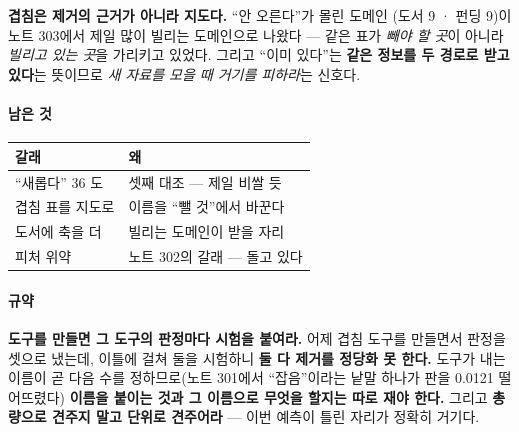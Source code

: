 \documentclass[10pt]{article}
\begin{document}
\textbf{겹침은 제거의 근거가 아니라 지도다.} ``안 오른다''가 몰린 도메인
(도서 9 · 펀딩 9)이 노트 303에서 제일 많이 빌리는 도메인으로 나왔다 ---
같은 표가 \emph{빼야 할 곳}이 아니라 \emph{빌리고 있는 곳}을 가리키고
있었다. 그리고 ``이미 있다''는 \textbf{같은 정보를 두 경로로 받고 있다}는
뜻이므로 \emph{새 자료를 모을 때 거기를 피하라}는 신호다.

\paragraph{남은 것}
\begin{center}\small
\begin{tabular}{ll}
\hline
갈래 & 왜 \\
\hline
``새롭다'' 36 도 & 셋째 대조 --- 제일 비쌀 듯 \\
겹침 표를 지도로 & 이름을 ``뺄 것''에서 바꾼다 \\
도서에 축을 더 & 빌리는 도메인이 받을 자리 \\
피처 위약 & 노트 302의 갈래 --- 돌고 있다 \\
\hline
\end{tabular}
\end{center}

\paragraph{규약} \textbf{도구를 만들면 그 도구의 판정마다 시험을 붙여라.}
어제 겹침 도구를 만들면서 판정을 셋으로 냈는데, 이틀에 걸쳐 둘을 시험하니
\textbf{둘 다 제거를 정당화 못 한다.} 도구가 내는 이름이 곧 다음 수를
정하므로(노트 301에서 ``잡음''이라는 낱말 하나가 판을 0.0121 떨어뜨렸다)
\textbf{이름을 붙이는 것과 그 이름으로 무엇을 할지는 따로 재야 한다.}
그리고 \textbf{총량으로 견주지 말고 단위로 견주어라} --- 이번 예측이
틀린 자리가 정확히 거기다.
\end{document}
